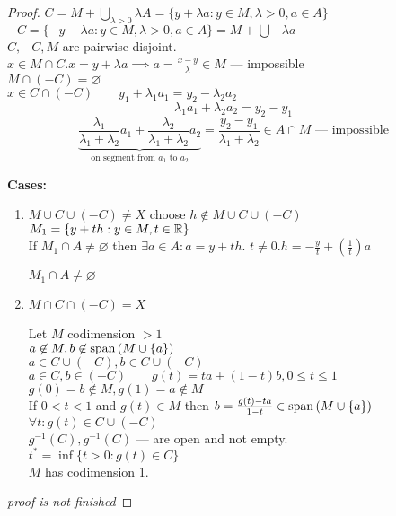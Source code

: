  \begin{proof}
   $C = M + \bigcup_{\lambda > 0} \lambda A = \{y + \lambda a : y \in  M, \lambda  > 0, a \in  A\} $ \\
   $-C = \{ -y - \lambda a : y \in  M, \lambda >0, a \in  A\}  = M + \bigcup -\lambda a$ \\
   $C, -C, M$ are pairwise disjoint.\\
   $x \in  M \cap C. x = y + \lambda a \implies a = \frac{x-y}{\lambda} \in M$ --- impossible\\
   $M \cap (-C) = \varnothing$\\

    $x \in  C \cap (-C) \qquad y_1 + \lambda_1 a_1 = y_2-\lambda_2 a_2$\\
    \[ \lambda_1 a_1 + \lambda_2 a_2 = y_2 - y_1 \] 
    \[ \underbrace{\frac{\lambda_1}{\lambda_1 + \lambda_2} a_1 + \frac{\lambda_2}{\lambda_1 + \lambda_2}a_2}_{\text{on segment from $a_1$ to $a_2$}} = \frac{y_2 - y_1}{\lambda_1 + \lambda_2} \in A \cap M \text{ --- impossible} \] 

    \textbf{Cases:}
    \begin{enumerate}
      \item $M \cup C \cup (-C) \neq X$ 
        choose $h \not\in M \cup C \cup (-C)$ \\
        $M_1 = \{y + th : y \in  M, t \in \mathbb{R}\} $ \\
        If $M_1 \cap A \neq \varnothing$ then $\exists a \in A : a = y + th$. $t \neq 0. h = -\frac{y}{t} + \left( \frac{1}{t} \right) a$

        $M_1 \cap A \neq \varnothing$ 

      \item $M \cap C \cap (-C) = X $

        Let $M$ codimension $>1$\\
        $a \not\in M, b \not\in  \operatorname{span}\left( M \cup \{a\}  \right) $ \\
        $a \in  C \cup (-C), b \in  C \cup (-C)$\\
        $a \in  C, b \in  (-C) \qquad g(t) = ta + (1-t)b, 0 \le t \le 1$\\
        $g(0) = b \not\in  M, g(1) = a \not\in  M$\\
        If $0 < t <1$ and $g(t) \in  M$ then  $b = \frac{g(t) - ta}{1-t} \in  \operatorname{span}\left( M \cup \{a\}  \right) $\\
        $\forall t: g(t) \in  C \cup (-C)$\\
        $g^{-1}(C), g^{-1}(C)$ --- are open and not empty.\\
        $t ^{*} = \inf \{t > 0: g(t) \in C\} $\\
        $M$ has codimension 1.
    \end{enumerate}

    \textit{proof is not finished}
 \end{proof}





